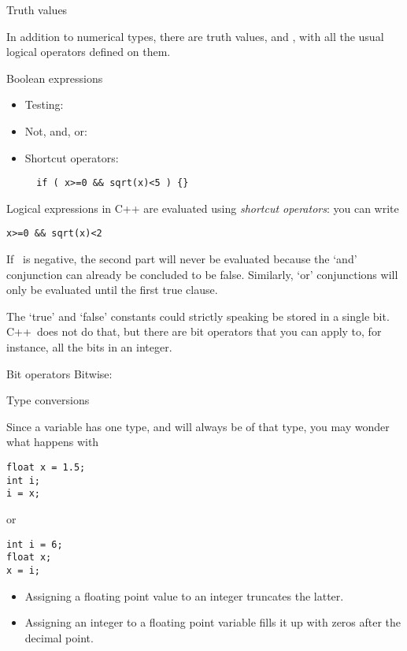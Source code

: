  {Truth values}

In addition to numerical types, there are truth values,
 and , with all the usual logical
operators defined on them.

\begin{block}{Boolean expressions}
  \label{sl:bool-expr}
  \begin{itemize}
  \item Testing: \n{== != < > <= >=}
  \item Not, and, or:   \n{! && ||}
  \item Shortcut operators:
\begin{lstlisting}
  if ( x>=0 && sqrt(x)<5 ) {}
\end{lstlisting}
  \end{itemize}
\end{block}

Logical expressions in C++ are evaluated using
\emph{shortcut operators}: you can write
\begin{lstlisting}
x>=0 && sqrt(x)<2
\end{lstlisting}
If ~is negative, the second part will never be evaluated because
the `and' conjunction can already be concluded to be false.
Similarly, `or' conjunctions will only be evaluated until the first
true clause.

The `true' and `false' constants could strictly speaking be stored in
a single bit. C++~does not do that, but there are bit
operators that you can apply to, for instance, all the bits in an integer.

\begin{block}{Bit operators}
  \label{sl:bit-oper}
 Bitwise: \n{& | ^}
\end{block}

 {Type conversions}

Since a variable has one type, and will always be of that type,
you may wonder what happens with
\begin{lstlisting}
float x = 1.5;
int i;
i = x;
\end{lstlisting}
or 
\begin{lstlisting}
int i = 6;
float x;
x = i;
\end{lstlisting}

\begin{itemize}
\item Assigning a floating point value to an integer truncates the
  latter.
\item Assigning an integer to a floating point variable fills it up
  with zeros after the decimal point.
\end{itemize}

